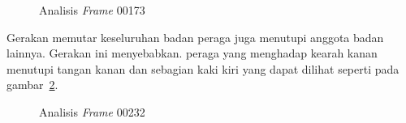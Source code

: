 \begin{figure}[htbp]
    \begin{center}
    \end{center}
    \vspace{-20pt}
    \captionsetup{labelfont=bf, textfont=bf}
    \caption{Analisis \textit{Frame} 00173}
    \vspace{-10pt}
    \captionsetup{labelfont=md, textfont=md}
    \label{fig:frame00173}
\end{figure}

\pagebreak

Gerakan memutar keseluruhan badan peraga juga menutupi anggota badan lainnya. Gerakan ini menyebabkan.
peraga yang menghadap kearah kanan menutupi tangan kanan dan sebagian kaki kiri yang dapat
dilihat seperti pada gambar~\ref{fig:frame00232}.

\begin{figure}[htbp]
    \begin{center}
    \end{center}
    \vspace{-20pt}
    \captionsetup{labelfont=bf, textfont=bf}
    \caption{Analisis \textit{Frame} 00232}
    \vspace{-10pt}
    \captionsetup{labelfont=md, textfont=md}
    \label{fig:frame00232}
\end{figure}

